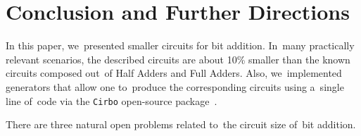 \documentclass[a4paper, UKenglish, cleveref, autoref,  thm-restate]{lipics-v2021}
\begin{document}
    \section{Conclusion and Further Directions}
    In this paper, we~presented smaller circuits for bit addition.
    In~many practically relevant scenarios, the described circuits
    are about 10\% smaller than the known circuits composed
    out~of Half Adders and Full Adders.
    Also, we~implemented generators that allow one
    to~produce the corresponding circuits using a~single line of~code
    via the \texttt{Cirbo} open-source package~\cite{DBLP:conf/aaai/AverkovBEGKKKLL25}.

    There are three natural open problems related to~the circuit size of~bit addition.
\end{document}

